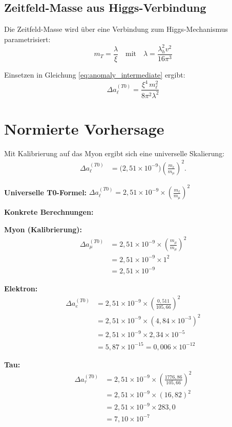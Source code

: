 \documentclass[12pt,a4paper]{article}
\theoremstyle{definition}
\begin{document}
	\subsection{Zeitfeld-Masse aus Higgs-Verbindung}
	
	Die Zeitfeld-Masse wird über eine Verbindung zum Higgs-Mechanismus parametrisiert\cite{pascher_higgs_connection_2025}:
	\begin{equation}
		m_T = \frac{\lambda}{\xi} \quad \text{mit} \quad \lambda = \frac{\lambda_h^2 v^2}{16\pi^3}
		\label{eq:higgs_connection}
	\end{equation}
	
	Einsetzen in Gleichung \eqref{eq:anomaly_intermediate} ergibt:
	\begin{equation}
		\Delta a_\ell^{(T0)} = \frac{\xi^4 \, m_\ell^2}{8\pi^2 \lambda^2}
		\label{eq:final_formula}
	\end{equation}
	
	\section{Normierte Vorhersage}
	
	Mit Kalibrierung auf das Myon ergibt sich eine universelle Skalierung:
	\begin{align}
		\Delta a_\ell^{(T0)} &= \big(2,51 \times 10^{-9}\big) \left(\frac{m_\ell}{m_\mu}\right)^2.
	\end{align}
	
	\begin{formula}
		\textbf{Universelle T0-Formel:}
		$\Delta a_\ell^{(T0)} = 2,51 \times 10^{-9} \times \left(\frac{m_\ell}{m_\mu}\right)^2$
		
		\textbf{Konkrete Berechnungen:}
		
		\textbf{Myon (Kalibrierung):}
		\begin{align}
			\Delta a_\mu^{(T0)} &= 2,51 \times 10^{-9} \times \left(\frac{m_\mu}{m_\mu}\right)^2\\
			&= 2,51 \times 10^{-9} \times 1^2\\
			&= 2,51 \times 10^{-9}
		\end{align}
		
		\textbf{Elektron:}
		\begin{align}
			\Delta a_e^{(T0)} &= 2,51 \times 10^{-9} \times \left(\frac{0,511}{105,66}\right)^2\\
			&= 2,51 \times 10^{-9} \times (4,84 \times 10^{-3})^2\\
			&= 2,51 \times 10^{-9} \times 2,34 \times 10^{-5}\\
			&= 5,87 \times 10^{-15} = 0,006 \times 10^{-12}
		\end{align}
		
		\textbf{Tau:}
		\begin{align}
			\Delta a_\tau^{(T0)} &= 2,51 \times 10^{-9} \times \left(\frac{1776,86}{105,66}\right)^2\\
			&= 2,51 \times 10^{-9} \times (16,82)^2\\
			&= 2,51 \times 10^{-9} \times 283,0\\
			&= 7,10 \times 10^{-7}
		\end{align}
	\end{formula}
	
\end{document}
